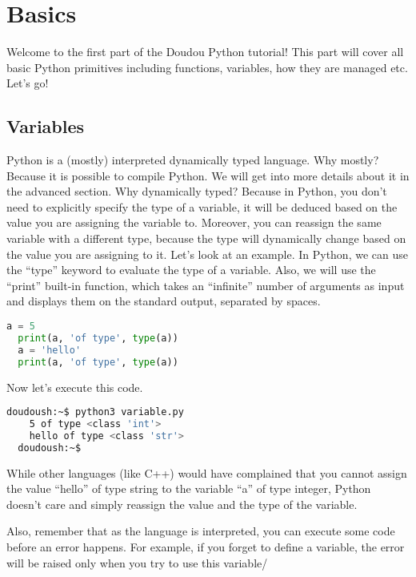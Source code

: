 
\section{Basics}

Welcome to the first part of the Doudou Python tutorial!  This part
will cover all basic Python primitives including functions, variables,
how they are managed etc. Let's go!

\subsection{Variables}

Python is a (mostly) interpreted dynamically typed language. Why
mostly? Because it is possible to compile Python. We will get into
more details about it in the advanced section. Why dynamically typed?
Because in Python, you don't need to explicitly specify the type of a
variable, it will be deduced based on the value you are assigning the
variable to. Moreover, you can reassign the same variable with a
different type, because the type will dynamically change based on the
value you are assigning to it. Let's look at an example. In Python,
we can use the ``type'' keyword to evaluate the type of a variable.
Also, we will use the ``print'' built-in function, which takes an
``infinite'' number of arguments as input and displays them on the
standard output, separated by spaces.

\begin{lstlisting}[language=python]
  a = 5
  print(a, 'of type', type(a))
  a = 'hello'
  print(a, 'of type', type(a))
\end{lstlisting}

Now let's execute this code.

\begin{lstlisting}[language=bash]
  doudoush:~$ python3 variable.py
    5 of type <class 'int'>
    hello of type <class 'str'>
  doudoush:~$
\end{lstlisting}

While other languages (like C++) would have complained that you cannot assign
the value ``hello'' of type string to the variable ``a'' of type integer, Python
doesn't care and simply reassign the value and the type of the variable.

\vspace{5mm}
Also, remember that as the language is interpreted, you can execute some code before
an error happens. For example, if you forget to define a variable, the error will
be raised only when you try to use this variable/

